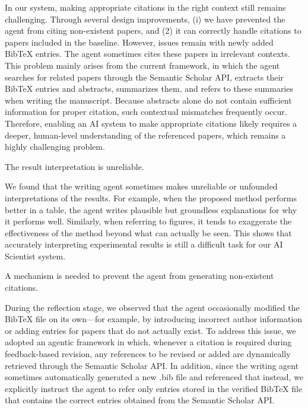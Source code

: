 In our system, making appropriate citations in the right context still remains challenging. Through several design improvements, (i) we have prevented the agent from citing non-existent papers, and (2) it can correctly handle citations to papers included in the baseline.
However, issues remain with newly added BibTeX entries.
The agent sometimes cites these papers in irrelevant contexts.
This problem mainly arises from the current framework, in which the agent searches for related papers through the Semantic Scholar API, extracts their BibTeX entries and abstracts, summarizes them, and refers to these summaries when writing the manuscript.
Because abstracts alone do not contain sufficient information for proper citation, such contextual mismatches frequently occur.
Therefore, enabling an AI system to make appropriate citations likely requires a deeper, human-level understanding of the referenced papers, which remains a highly challenging problem.

\begin{tcolorbox}[colback=gray!10, colframe=gray!40!black, title=Writing Risk3 :,breakable]
    The result interpretation is unreliable.
\end{tcolorbox}
We found that the writing agent sometimes makes unreliable or unfounded interpretations of the results.
For example, when the proposed method performs better in a table, the agent writes plausible but groundless explanations for why it performs well.
Similarly, when referring to figures, it tends to exaggerate the effectiveness of the method beyond what can actually be seen.
This shows that accurately interpreting experimental results is still a difficult task for our AI Scientist system.

\begin{tcolorbox}[colback=gray!10, colframe=gray!40!black, title=Writing Risk4 :,breakable]
    A mechanism is needed to prevent the agent from generating non-existent citations.
\end{tcolorbox}
During the reflection stage, we observed that the agent occasionally modified the BibTeX file on its own—for example, by introducing incorrect author information or adding entries for papers that do not actually exist.
To address this issue, we adopted an agentic framework in which, whenever a citation is required during feedback-based revision, any references to be revised or added are dynamically retrieved through the Semantic Scholar API.
In addition, since the writing agent sometimes automatically generated a new .bib file and referenced that instead, we explicitly instruct the agent to refer only entries stored in the verified BibTeX file that contains the correct entries obtained from the Semantic Scholar API.



